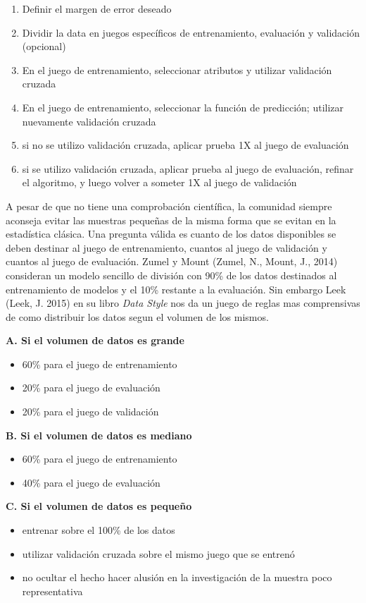 \documentclass[letterpaper, spanish, 11pt]{report}
\begin{document}
\begin{enumerate}
	\item Definir el margen de error deseado
	\item Dividir la data en juegos específicos de entrenamiento, evaluación y validación (opcional)
	\item En el juego de entrenamiento, seleccionar atributos y utilizar validación cruzada
	\item En el juego de entrenamiento, seleccionar la función de predicción; utilizar nuevamente validación cruzada
	\item si no se utilizo validación cruzada, aplicar prueba 1X al juego de evaluación
	\item si se utilizo validación cruzada, aplicar prueba al juego de evaluación, refinar el algoritmo, y luego volver a someter 1X al juego de validación 
\end{enumerate}

A pesar de que no tiene una comprobación científica, la comunidad siempre aconseja evitar las muestras pequeñas de la misma forma que se evitan en la estadística clásica. Una pregunta válida es cuanto de los datos disponibles se deben destinar al juego de entrenamiento, cuantos al juego de validación y cuantos al juego de evaluación. Zumel y Mount (Zumel, N., Mount, J., 2014) consideran un modelo sencillo de división con 90\% de los datos destinados al entrenamiento de modelos y el 10\% restante a la evaluación. Sin embargo Leek (Leek, J. 2015) en su libro \emph{Data Style} nos da un juego de reglas mas comprensivas de como distribuir los datos segun el volumen de los mismos. 

\textbf{A. Si el volumen de datos es grande}
\begin{itemize}
	\item 60\% para el juego de entrenamiento
	\item 20\% para el juego de evaluación
	\item 20\% para el juego de validación 
\end{itemize}

\textbf{B. Si el volumen de datos es mediano}
\begin{itemize}
	\item 60\% para el juego de entrenamiento
	\item 40\% para el juego de evaluación
\end{itemize}

\textbf{C. Si el volumen de datos es pequeño}
\begin{itemize}
	\item entrenar sobre el 100\% de los datos
	\item utilizar validación cruzada sobre el mismo juego que se entrenó
	\item no ocultar el hecho hacer alusión en la investigación de la muestra poco representativa
\end{itemize}
\end{document}
